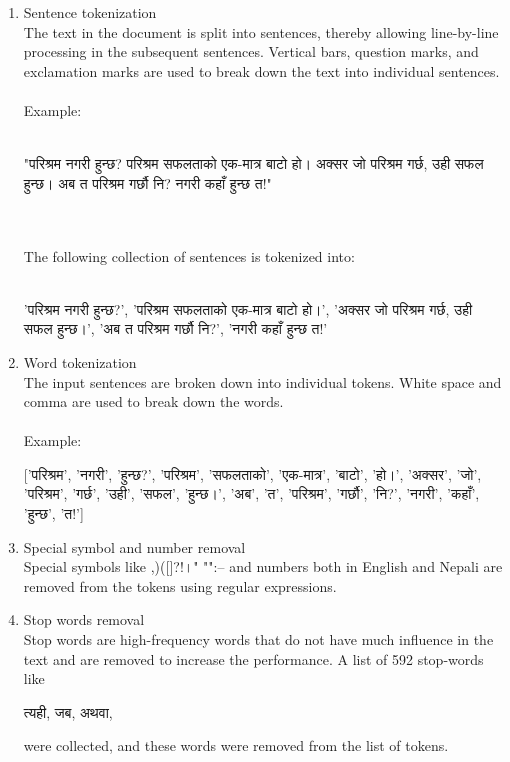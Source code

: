 \documentclass[conference]{IEEEtran}
\begin{document}
\begin{enumerate}
\item Sentence tokenization\\
The text in the document is split into sentences, thereby allowing line-by-line
processing in the subsequent sentences. Vertical bars, question marks, and 
exclamation marks are used to break down the text into individual sentences. \\
\\Example:\\\\
\begin{sanskrit}
  "परिश्रम नगरी हुन्छ? परिश्रम सफलताको एक-मात्र बाटो हो। अक्सर जो परिश्रम गर्छ, उही सफल हुन्छ। अब त परिश्रम गर्छौ नि? नगरी कहाँ हुन्छ त!"
\end{sanskrit}\\\\
The following collection of sentences is tokenized into:\\\\
  \begin{sanskrit}
  'परिश्रम नगरी हुन्छ?', 'परिश्रम सफलताको एक-मात्र बाटो हो।', 'अक्सर जो परिश्रम गर्छ, उही सफल हुन्छ।', 'अब त परिश्रम गर्छौ नि?', 'नगरी कहाँ हुन्छ त!'
\end{sanskrit}
\medskip

\item Word tokenization\\
The input sentences are broken down into individual tokens. White space and
comma are used to break down the words. \\
\\Example:\\
\begin{sanskrit}
  
['परिश्रम', 'नगरी', 'हुन्छ?', 'परिश्रम', 'सफलताको', 'एक-मात्र', 'बाटो', 'हो।', 'अक्सर', 'जो', 'परिश्रम', 'गर्छ', 'उही', 'सफल', 'हुन्छ।', 'अब', 'त', 'परिश्रम', 'गर्छौ', 'नि?', 'नगरी', 'कहाँ', 'हुन्छ', 'त!']
\end{sanskrit}
\medskip

\item Special symbol and number removal\\
Special symbols like ,)({}[]?!।"  "":-- and numbers both in English and Nepali are removed from the tokens using regular expressions.
\medskip

\item Stop words removal\\
Stop words are high-frequency words that do not have much influence in the text and are removed to increase the performance.
A list of 592  stop-words like \begin{sanskrit}त्यही, जब, अथवा,\end{sanskrit} were collected, and these words were removed from the list of tokens. 
\medskip


\end{enumerate}
\end{document}

